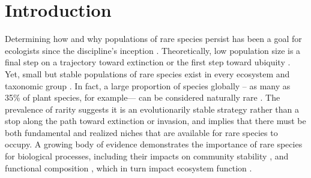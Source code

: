\documentclass[12pt, letterpaper]{article}
\begin{document}
\section{Introduction}
Determining how and why populations of rare species persist has been a goal for ecologists since the discipline's inception \cite{Levins1971RegionalSpecies, Drury1974RareSpecies}. Theoretically, low population size is a final step on a trajectory toward extinction \cite{Stanley1979Macroevolution:Process} or the first step toward ubiquity \cite{Spear2021}.  Yet, small but stable populations of rare species exist in every ecosystem and taxonomic group \cite{Magurran2011CommonnessRarity}. In fact, a large proportion of species globally – as many as 35\% of plant species, for example— can be considered naturally rare \cite{Enquist2019ThePlants}. The prevalence of rarity suggests it is an evolutionarily stable strategy rather than a stop along the path toward extinction or invasion, and implies that there must be both fundamental and realized niches that are available for rare species to occupy. A growing body of evidence demonstrates the importance of rare species for biological processes, including their impacts on community stability \cite{Arnoldi2019ThePatterns}, and functional composition \cite{Burner2022FunctionalSpecies}, which in turn impact ecosystem function \cite{Lyons2005RareFunctioning}. 
\end{document}
